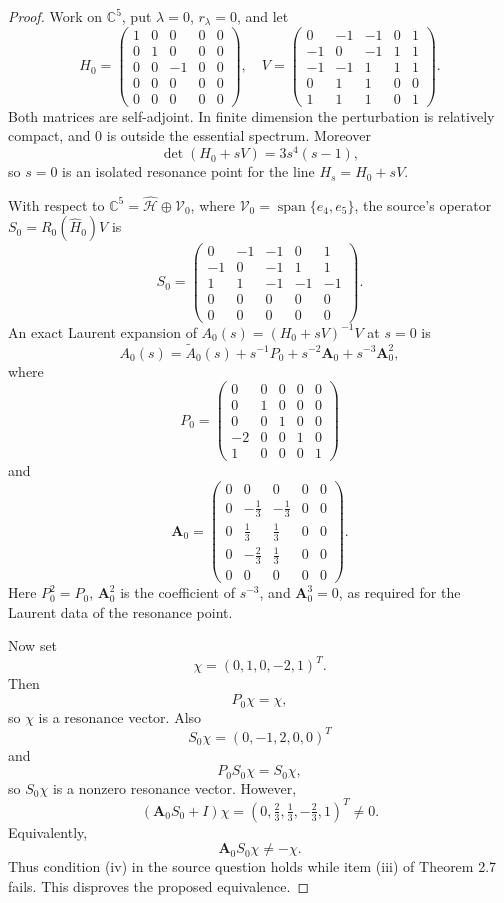 \documentclass[11pt]{article}
\newcommand{\C}{\mathbb C}
\newcommand{\Aop}{\mathbf A_0}
\begin{document}
\begin{proof}
Work on \(\C^5\), put \(\lambda=0\), \(r_\lambda=0\), and let
\[
H_0=
\begin{pmatrix}
1&0&0&0&0\\
0&1&0&0&0\\
0&0&-1&0&0\\
0&0&0&0&0\\
0&0&0&0&0
\end{pmatrix},
\quad
V=
\begin{pmatrix}
0&-1&-1&0&1\\
-1&0&-1&1&1\\
-1&-1&1&1&1\\
0&1&1&0&0\\
1&1&1&0&1
\end{pmatrix}.
\]
Both matrices are self-adjoint. In finite dimension the perturbation is
relatively compact, and \(0\) is outside the essential spectrum. Moreover
\[
  \det(H_0+sV)=3s^4(s-1),
\]
so \(s=0\) is an isolated resonance point for the line \(H_s=H_0+sV\).

With respect to
\(\C^5=\widehat{\mathcal H}\oplus\mathcal V_0\), where
\(\mathcal V_0=\operatorname{span}\{e_4,e_5\}\), the source's operator
\(S_0=R_0(\widehat H_0)V\) is
\[
S_0=
\begin{pmatrix}
0&-1&-1&0&1\\
-1&0&-1&1&1\\
1&1&-1&-1&-1\\
0&0&0&0&0\\
0&0&0&0&0
\end{pmatrix}.
\]
An exact Laurent expansion of \(A_0(s)=(H_0+sV)^{-1}V\) at \(s=0\) is
\[
  A_0(s)=\widetilde A_0(s)+s^{-1}P_0+s^{-2}\Aop+s^{-3}\Aop^2,
\]
where
\[
P_0=
\begin{pmatrix}
0&0&0&0&0\\
0&1&0&0&0\\
0&0&1&0&0\\
-2&0&0&1&0\\
1&0&0&0&1
\end{pmatrix}
\]
and
\[
\Aop=
\begin{pmatrix}
0&0&0&0&0\\
0&-\frac13&-\frac13&0&0\\
0&\frac13&\frac13&0&0\\
0&-\frac23&\frac13&0&0\\
0&0&0&0&0
\end{pmatrix}.
\]
Here \(P_0^2=P_0\), \(\Aop^2\) is the coefficient of \(s^{-3}\), and
\(\Aop^3=0\), as required for the Laurent data of the resonance point.

Now set
\[
  \chi=(0,1,0,-2,1)^T.
\]
Then
\[
  P_0\chi=\chi,
\]
so \(\chi\) is a resonance vector. Also
\[
  S_0\chi=(0,-1,2,0,0)^T
\]
and
\[
  P_0S_0\chi=S_0\chi,
\]
so \(S_0\chi\) is a nonzero resonance vector. However,
\[
  (\Aop S_0+I)\chi
  =
  (0,\tfrac23,\tfrac13,-\tfrac23,1)^T
  \ne0.
\]
Equivalently,
\[
  \Aop S_0\chi\ne-\chi.
\]
Thus condition (iv) in the source question holds while item (iii) of
Theorem 2.7 fails. This disproves the proposed equivalence.
\end{proof}
\end{document}
